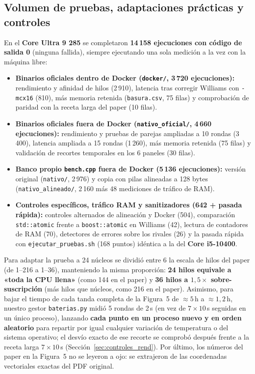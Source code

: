 \documentclass[11pt,a4paper]{article}
\begin{document}
\subsection{Volumen de pruebas, adaptaciones prácticas y controles}
En el \textbf{Core Ultra 9 285} se completaron \textbf{14\,158 ejecuciones con código de salida 0} (ninguna fallida), siempre ejecutando una sola medición a la vez con la máquina libre:
\begin{itemize}
  \item \textbf{Binarios oficiales dentro de Docker (\texttt{docker/}, 3\,720 ejecuciones):} rendimiento y afinidad de hilos (2\,910), latencia tras corregir Williams con \texttt{-mcx16} (810), más memoria retenida (\texttt{basura.csv}, 75 filas) y comprobación de paridad con la receta larga del paper (10 filas).
  \item \textbf{Binarios oficiales fuera de Docker (\texttt{nativo\_oficial/}, 4\,660 ejecuciones):} rendimiento y pruebas de parejas ampliadas a 10 rondas (3\,400), latencia ampliada a 15 rondas (1\,260), más memoria retenida (75 filas) y validación de recortes temporales en los 6 paneles (30 filas).
  \item \textbf{Banco propio \texttt{bench.cpp} fuera de Docker (5\,136 ejecuciones):} versión original (\texttt{nativo/}, 2\,976) y copia con pilas alineadas a 128 bytes (\texttt{nativo\_alineado/}, 2\,160 más 48 mediciones de tráfico de RAM).
  \item \textbf{Controles específicos, tráfico RAM y sanitizadores (642 + pasada rápida):} controles alternados de alineación y Docker (504), comparación \texttt{std::atomic} frente a \texttt{boost::atomic} en Williams (42), lectura de contadores de RAM (70), detectores de errores sobre los rivales (26) y la pasada rápida con \texttt{ejecutar\_pruebas.sh} (168 puntos) idéntica a la del \textbf{Core i5-10400}.
\end{itemize}

Para adaptar la prueba a 24 núcleos se dividió entre 6 la escala de hilos del paper (de 1--216 a 1--36), manteniendo la misma proporción: \textbf{24 hilos equivale a «toda la CPU llena»} (como 144 en el paper) y \textbf{36 hilos a $1,5\times$ sobre-suscripción} (más hilos que núcleos, como 216 en el paper). Asimismo, para bajar el tiempo de cada tanda completa de la Figura~5 de $\approx 5$\,h a $\approx 1,2$\,h, nuestro gestor \texttt{baterias.py} midió 5 rondas de 2\,s (en vez de $7 \times 10$\,s seguidas en un único proceso), lanzando \textbf{cada punto en un proceso nuevo y en orden aleatorio} para repartir por igual cualquier variación de temperatura o del sistema operativo; el desvío exacto de ese recorte se comprobó después frente a la receta larga $7 \times 10$\,s (Sección~\ref{sec:controles_rend}). Por último, los números del paper en la Figura~5 no se leyeron a ojo: se extrajeron de las coordenadas vectoriales exactas del PDF original.
\end{document}
